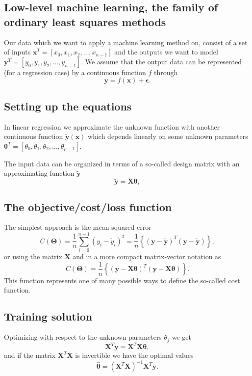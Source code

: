 \documentclass[%
oneside,                 %
final,                   %
10pt]{article}
\begin{document}
\subsection{Low-level machine learning, the family of ordinary least squares methods}

Our data which we want to apply a machine learning method on, consist
of a set of inputs $\bm{x}^T=[x_0,x_1,x_2,\dots,x_{n-1}]$ and the
outputs we want to model $\bm{y}^T=[y_0,y_1,y_2,\dots,y_{n-1}]$.
We assume  that the output data can be represented (for a regression case) by a continuous function $f$
through
\[
\bm{y}=f(\bm{x})+\bm{\epsilon}.
\]

\subsection{Setting up the equations}

In linear regression we approximate the unknown function with another
continuous function $\tilde{\bm{y}}(\bm{x})$ which depends linearly on
some unknown parameters
$\bm{\theta}^T=[\theta_0,\theta_1,\theta_2,\dots,\theta_{p-1}]$.

The input data can be organized in terms of a so-called design matrix 
with an approximating function $\bm{\tilde{y}}$ 
\[
\bm{\tilde{y}}= \bm{X}\bm{\theta},
\]

\subsection{The objective/cost/loss function}

The  simplest approach is the mean squared error
\[
C(\bm{\Theta})=\frac{1}{n}\sum_{i=0}^{n-1}\left(y_i-\tilde{y}_i\right)^2=\frac{1}{n}\left\{\left(\bm{y}-\bm{\tilde{y}}\right)^T\left(\bm{y}-\bm{\tilde{y}}\right)\right\},
\]
or using the matrix $\bm{X}$ and in a more compact matrix-vector notation as
\[
C(\bm{\Theta})=\frac{1}{n}\left\{\left(\bm{y}-\bm{X}\bm{\theta}\right)^T\left(\bm{y}-\bm{X}\bm{\theta}\right)\right\}.
\]
This function represents one of many possible ways to define the so-called cost function.

\subsection{Training solution}

Optimizing with respect to the unknown parameters $\theta_j$ we get 
\[
\bm{X}^T\bm{y} = \bm{X}^T\bm{X}\bm{\theta},  
\]
and if the matrix $\bm{X}^T\bm{X}$ is invertible we have the optimal values
\[
\hat{\bm{\theta}} =\left(\bm{X}^T\bm{X}\right)^{-1}\bm{X}^T\bm{y}.
\]
\end{document}
